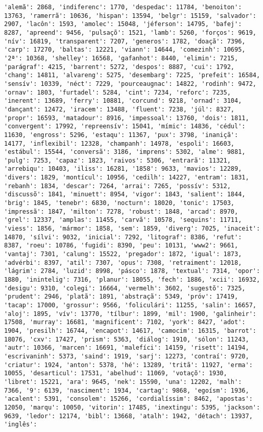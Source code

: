 \begin{Verbatim}[commandchars=\\\{\}]
'alemã': 2868, 'indiferenc': 1770, 'despedac': 11784, 'benoiton': 13763, 'ramerrã': 10636, 'hispan': 13594, 'belgr': 15159, 'salvador': 2907, 'lacôn': 1593, 'amolec': 15048, 'jéferson': 14795, 'bafej': 8287, 'apreend': 9456, 'pulsaçõ': 1521, 'lamb': 5260, 'forços': 9619, 'nív': 16819, 'transparent': 7207, 'generos': 1782, 'doaçã': 7396, 'carp': 17270, 'baltas': 12221, 'viann': 14644, 'comezinh': 10695, '2ª': 10368, 'shelley': 16568, 'gafanhot': 8440, 'elimin': 7215, 'parágraf': 4215, 'barrent': 5272, 'despos': 8887, 'cui': 1792, 'chang': 14811, 'alvareng': 5275, 'desembarg': 7225, 'prefeit': 16584, 'sensív': 10339, 'néct': 7229, 'pourceaugnac': 14822, 'rodinh': 9472, 'ornav': 1803, 'furtadel': 5284, 'cint': 7234, 'reforc': 7235, 'inerent': 13689, 'ferry': 10881, 'corcund': 9218, 'ornad': 3104, 'dançant': 12472, 'iracem': 13488, 'fluent': 7238, 'júl': 8327, 'propr': 16593, 'matadour': 8916, 'impessoal': 13760, 'dois': 1811, 'convergent': 17992, 'repreensív': 15041, 'mímic': 14836, 'cédul': 11630, 'engross': 5296, 'estaqu': 11367, 'pux': 3798, 'inaniçã': 14177, 'inflexibil': 12328, 'champanh': 14978, 'espoli': 16603, 'estábul': 15544, 'conversã': 3186, 'imprens': 5302, 'alme': 9881, 'pulg': 7253, 'capaz': 1823, 'raivos': 5306, 'entrarã': 11321, 'arrebiqu': 10403, 'iliss': 16281, '1858': 9633, 'mavios': 12289, 'divers': 1829, 'montícul': 10956, 'cedilh': 14227, 'entram': 1831, 'rebanh': 1834, 'descar': 7264, 'arrai': 7265, 'possív': 5312, 'discussõ': 1841, 'minuett': 8954, 'vigor': 1843, 'salient': 1844, 'brig': 1845, 'tenebr': 6830, 'nocturn': 18020, 'tonic': 17503, 'impressã': 1847, 'milton': 7278, 'robust': 1848, 'arcad': 8970, 'grel': 12337, 'amplas': 11455, 'carvã': 10578, 'sequins': 11711, 'viess': 1856, 'mármor': 1858, 'sem': 1859, 'diverg': 7025, 'inaceit': 14870, 'sílvi': 9032, 'inicial': 7292, 'litograf': 8386, 'refut': 8387, 'roeu': 10786, 'fugidi': 8390, 'peu': 10131, 'www2': 9661, 'vantaj': 7301, 'calung': 15522, 'pregador': 1872, 'igual': 1873, 'advérbi': 8397, 'atil': 7307, 'opus': 7308, 'retraiment': 12018, 'lágrim': 2784, 'luzid': 8998, 'pásco': 1878, 'textual': 7314, 'opor': 1880, 'inintelig': 7316, 'planur': 18055, 'fech': 1886, 'xcii': 16932, 'desigu': 9310, 'colegi': 16664, 'vermelh': 3602, 'sugestõ': 7325, 'prudent': 2946, 'platã': 1891, 'abstraçã': 5349, 'próv': 17419, 'tacap': 17000, 'grossur': 9566, 'foliculári': 11255, 'salin': 16657, 'aloj': 1895, 'vív': 13770, 'tílbur': 1899, 'mil': 1900, 'galinheir': 17508, 'murray': 16681, 'magnificent': 7102, 'york': 8427, 'adot': 1904, 'presilh': 16744, 'encapot': 14617, 'camocim': 16315, 'barrot': 18076, 'cxv': 17427, 'prism': 5363, 'diálog': 1910, 'sólon': 11243, 'autr': 10366, 'marcen': 16691, 'malefíci': 14159, 'risett': 14194, 'escrivaninh': 5373, 'saind': 1919, 'sarj': 12273, 'contraí': 9720, 'criatur': 1924, 'anton': 5378, 'hé': 13289, 'tritã': 11927, 'erma': 10055, 'desarticul': 17531, 'abelhud': 11069, 'votaçõ': 1930, 'libret': 15221, 'ara': 9645, 'nek': 15590, 'una': 12202, 'malh': 7366, '9': 6139, 'nasciment': 1934, 'cartag': 9868, 'egoísm': 1936, 'acalent': 5391, 'consolem': 15266, 'cordialíssim': 8462, 'apostas': 12050, 'marqu': 10050, 'vitorin': 17485, 'inextingu': 5395, 'jackson': 9639, 'ledor': 12174, 'bibl': 13668, 'atalh': 1942, 'détach': 13937, 'inglês': 
\end{Verbatim}
